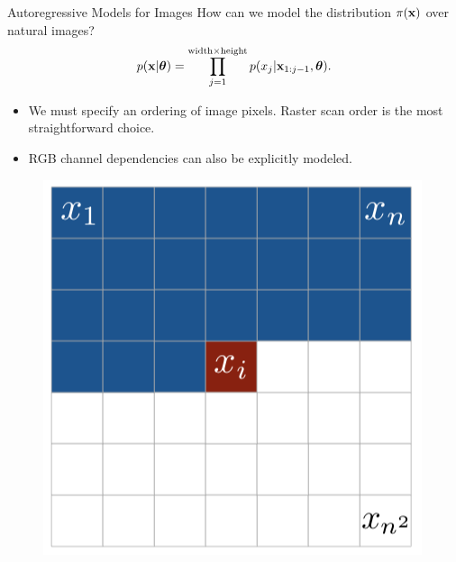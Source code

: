 \documentclass{beamer}
\begin{document}
\begin{frame}{Autoregressive Models for Images}
	How can we model the distribution $\pi(\mathbf{x})$ over natural images?
	$$
  		p(\mathbf{x} | \boldsymbol{\theta}) = \prod_{j=1}^{\text{width} \times \text{height}} p(x_j|\mathbf{x}_{1:j-1}, \boldsymbol{\theta}).
	$$
	\begin{minipage}[t]{0.5\columnwidth}
		\vspace{0.5cm}
		\begin{itemize}
			\item We must specify an ordering of image pixels. Raster scan order is the most straightforward choice.
		    \item RGB channel dependencies can also be explicitly modeled.
		\end{itemize}
	\end{minipage}%
	\begin{minipage}[t]{0.5\columnwidth}
		\begin{figure}
			\centering
   			\includegraphics[width=0.9\linewidth]{figs/pixelcnn1.png}
		\end{figure}
	\end{minipage}
\end{frame}
\end{document}
